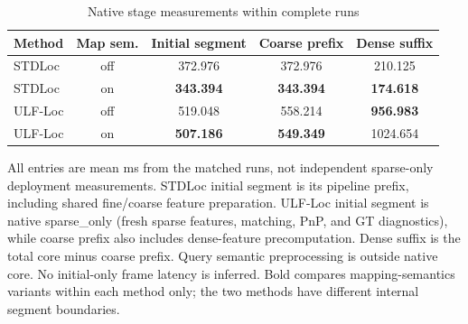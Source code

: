 \begin{table}[tp]
\centering
\footnotesize
\setlength{\tabcolsep}{4pt}
\renewcommand{\arraystretch}{1.12}
\caption{Native stage measurements within complete runs}
\label{tab:s_native_stages}
\begin{tabular}{lcccc}
\toprule
Method & Map sem. & Initial segment & Coarse prefix & Dense suffix \\
\midrule
STDLoc & off & 372.976 & 372.976 & 210.125 \\
STDLoc & on & \textbf{343.394} & \textbf{343.394} & \textbf{174.618} \\
ULF-Loc & off & 519.048 & 558.214 & \textbf{956.983} \\
ULF-Loc & on & \textbf{507.186} & \textbf{549.349} & 1024.654 \\
\bottomrule
\end{tabular}
\par\smallskip\begin{minipage}{0.98\linewidth}\footnotesize All entries are mean ms from the matched runs, not independent sparse-only deployment measurements. STDLoc initial segment is its pipeline prefix, including shared fine/coarse feature preparation. ULF-Loc initial segment is native sparse\_only (fresh sparse features, matching, PnP, and GT diagnostics), while coarse prefix also includes dense-feature precomputation. Dense suffix is the total core minus coarse prefix. Query semantic preprocessing is outside native core. No initial-only frame latency is inferred. Bold compares mapping-semantics variants within each method only; the two methods have different internal segment boundaries.\end{minipage}
\end{table}
